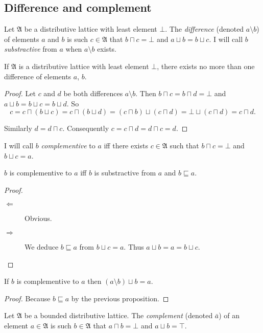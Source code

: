 \subsection{Difference and complement}
\begin{defn}
Let $\mathfrak{A}$ be a distributive
lattice with least element $\bot$. The \emph{difference} (denoted
$a\setminus b$) of elements $a$ and $b$ is such $c\in\mathfrak{A}$
that $b\sqcap c=\bot$ and $a\sqcup b=b\sqcup c$. I will call $b$
\emph{substractive} from \textbf{$a$} when $a\setminus b$ exists.\end{defn}
\begin{thm}
If $\mathfrak{A}$ is a distributive lattice with least element $\bot$,
there exists no more than one difference of elements $a$, $b$.\end{thm}
\begin{proof}
Let $c$ and $d$ be both differences $a\setminus b$. Then $b\sqcap c=b\sqcap d=\bot$
and $a\sqcup b=b\sqcup c=b\sqcup d$. So
\[
c=c\sqcap(b\sqcup c)=c\sqcap(b\sqcup d)=(c\sqcap b)\sqcup(c\sqcap d)=\bot\sqcup(c\sqcap d)=c\sqcap d.
\]


Similarly $d=d\sqcap c$. Consequently $c=c\sqcap d=d\sqcap c=d$.\end{proof}
\begin{defn}
I will call $b$ \emph{complementive} to $a$
iff there exists $c\in\mathfrak{A}$ such that $b\sqcap c=\bot$ and
$b\sqcup c=a$.\end{defn}
\begin{prop}
$b$ is complementive to $a$ iff $b$ is substractive from $a$ and
$b\sqsubseteq a$.\end{prop}
\begin{proof}
~
\begin{description}
\item [{$\Leftarrow$}] Obvious.
\item [{$\Rightarrow$}] We deduce $b\sqsubseteq a$ from $b\sqcup c=a$.
Thus $a\sqcup b=a=b\sqcup c$.
\end{description}
\end{proof}
\begin{prop}
If $b$ is complementive to $a$ then $(a\setminus b)\sqcup b=a$.\end{prop}
\begin{proof}
Because $b\sqsubseteq a$ by the previous proposition.\end{proof}
\begin{defn}
Let $\mathfrak{A}$ be a bounded distributive lattice.
The \emph{complement} (denoted $\bar{a}$) of an element $a\in\mathfrak{A}$
is such $b\in\mathfrak{A}$ that $a\sqcap b=\bot$ and $a\sqcup b=\top$.\end{defn}
